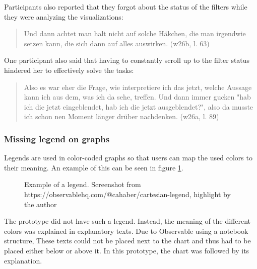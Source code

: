 Participants also reported that they forgot about the status of the filters while they were analyzing the visualizations:

\begin{quote}
    Und dann achtet man halt nicht auf solche Häkchen, die man irgendwie setzen kann, die sich dann auf alles auswirken. (w26b, l. 63)
\end{quote}

One participant also said that having to constantly scroll up to the filter status hindered her to effectively solve the tasks:

\begin{quote}
    Also es war eher die Frage, wie interpretiere ich das jetzt, welche Aussage kann ich aus dem, was ich da sehe, treffen. Und dann immer gucken "hab ich die jetzt eingeblendet, hab ich die jetzt ausgeblendet?", also da musste ich schon nen Moment länger drüber nachdenken. (w26a, l. 89)
\end{quote}

\subsubsection*{Missing legend on graphs}
Legends are used in color-coded graphs so that users can map the used colors to their meaning. An example of this can be seen in figure \ref{fig:legend_example}.

\begin{figure}[h!tb]
    \centering
    \caption{Example of a legend. Screenshot from https://observablehq.com/@cahaber/cartesian-legend, highlight by the author}
    \label{fig:legend_example}
\end{figure}

The prototype did not have such a legend. Instead, the meaning of the different colors was explained in explanatory texts. Due to Observable using a notebook structure, These texts could not be placed next to the chart and thus had to be placed either below or above it. In this prototype, the chart was followed by its explanation.%

